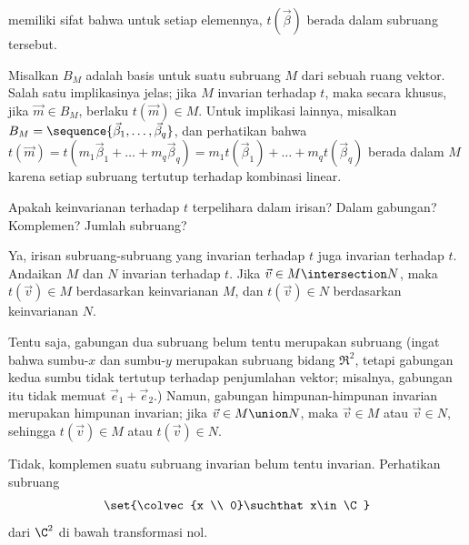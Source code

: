 \begin{exercises}
    memiliki sifat bahwa untuk setiap elemennya, $t(\vec{\beta})$ berada dalam
    subruang tersebut.
    \begin{answer}
      Misalkan \( B_M \) adalah basis untuk suatu subruang \( M \) dari sebuah
      ruang vektor.
      Salah satu implikasinya jelas; jika \( M \) invarian terhadap \( t \), maka
      secara khusus, jika \( \vec{m}\in B_M \), berlaku \( t(\vec{m})\in M \).
      Untuk implikasi lainnya, misalkan
      \( B_M=\sequence{\vec{\beta}_1,\dots,\vec{\beta}_q} \), dan perhatikan bahwa
      \( t(\vec{m})=t(m_1\vec{\beta}_1+\dots+m_q\vec{\beta}_q)
                   =m_1t(\vec{\beta}_1)+\dots+m_qt(\vec{\beta}_q) \)
      berada dalam \( M \) karena setiap subruang tertutup terhadap kombinasi
      linear.
    \end{answer}
  \recommended \item 
    Apakah keinvarianan terhadap \( t \) terpelihara dalam irisan?
    Dalam gabungan?
    Komplemen?
    Jumlah subruang?
    \begin{answer}
      Ya, irisan subruang-subruang yang invarian terhadap $t$
      juga invarian terhadap $t$.
      Andaikan \( M \) dan \( N \) invarian terhadap \( t \).
      Jika \( \vec{v}\in M\intersection N \), maka \( t(\vec{v})\in M \)
      berdasarkan keinvarianan \( M \), dan \( t(\vec{v})\in N \) berdasarkan
      keinvarianan \( N \).

      Tentu saja, gabungan dua subruang belum tentu merupakan subruang
      (ingat bahwa sumbu-$x$\hbox{} dan sumbu-$y$ merupakan subruang bidang
      $\Re^2$, tetapi gabungan kedua sumbu tidak tertutup terhadap
      penjumlahan vektor; misalnya, gabungan itu tidak memuat
      $\vec{e}_1+\vec{e}_2$.)
      Namun, gabungan himpunan-himpunan invarian merupakan himpunan invarian; jika
      \( \vec{v}\in M\union N \), maka \( \vec{v}\in M \) atau \( \vec{v}\in N \),
      sehingga \( t(\vec{v})\in M \) atau \( t(\vec{v})\in N \).

      Tidak, komplemen suatu subruang invarian belum tentu invarian.
      Perhatikan subruang
      \begin{equation*}
        \set{\colvec{x \\ 0}\suchthat x\in\C}
      \end{equation*}
      dari \( \C^2 \) di bawah transformasi nol.


\end{answer}
\end{exercises}
